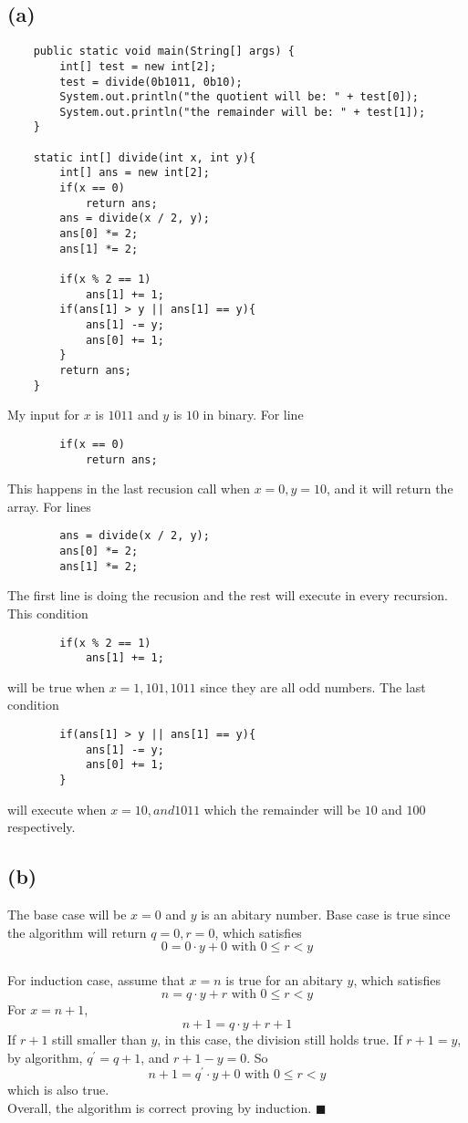 \documentclass{article}
\begin{document}
    \subsection{(a)}
    \begin{verbatim}
    public static void main(String[] args) {
        int[] test = new int[2];
        test = divide(0b1011, 0b10);
        System.out.println("the quotient will be: " + test[0]);
        System.out.println("the remainder will be: " + test[1]);
    }

    static int[] divide(int x, int y){
        int[] ans = new int[2];
        if(x == 0)
            return ans;
        ans = divide(x / 2, y);
        ans[0] *= 2;
        ans[1] *= 2;

        if(x % 2 == 1)
            ans[1] += 1;
        if(ans[1] > y || ans[1] == y){
            ans[1] -= y;
            ans[0] += 1;
        }
        return ans;
    }
    \end{verbatim}
    My input for $x$ is $1011$ and $y$ is $10$ in binary.
    For line
    \begin{verbatim}
        if(x == 0)
            return ans;
    \end{verbatim}
    This happens in the last recusion call when $x = 0, y = 10$, and it will return the array.
    For lines
    \begin{verbatim}
        ans = divide(x / 2, y);
        ans[0] *= 2;
        ans[1] *= 2;
    \end{verbatim}
    The first line is doing the recusion and the rest will execute in every recursion.
    This condition
    \begin{verbatim}
        if(x % 2 == 1)
            ans[1] += 1;
    \end{verbatim}
    will be true when $x = 1, 101,1011$ since they are all odd numbers.
    The last condition
    \begin{verbatim}
        if(ans[1] > y || ans[1] == y){
            ans[1] -= y;
            ans[0] += 1;
        }
    \end{verbatim}
    will execute when $x = 10, and 1011$ which the remainder will be $10$ and $100$ respectively.

    \subsection{(b)}


The base case will be $x = 0$ and $y$ is an abitary number.
Base case is true since the algorithm will return $q = 0, r = 0$, which satisfies
$$0 = 0 \cdot y + 0 \mbox{ with } 0 \leq r < y $$
\\
For induction case, assume that $x = n$ is true for an abitary $y$, which satisfies
$$n = q \cdot y + r \mbox{ with } 0\leq r < y $$
For $x = n+1$,
$$n+1 = q \cdot y + r + 1$$ 
If $r+1$ still smaller than $y$, in this case, the division still holds true.
If $r+1 = y$, by algorithm, $q^\prime = q + 1$, and $r+1 - y = 0$.
So 
$$n+1 = q^\prime \cdot y  + 0 \mbox{ with } 0 \leq r < y$$
which is also true.
\\
Overall, the algorithm is correct proving by induction. $\blacksquare$
    
\end{document}
